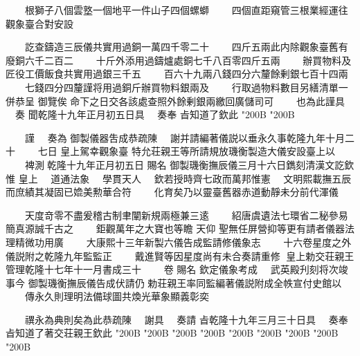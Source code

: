 \begin{正文}
　　根獅子八個雲墪一個地平一件山子四個螺螄
　　四個直距窺管三根業經運往觀象臺合對安設
\par
　　訖查鑄造三辰儀共實用過銅一萬四千零二十
　　四斤五兩此内除觀象臺舊有廢銅六千二百二
　　十斤外添用過鑄爐處銅七千八百零四斤五兩
　　辦買物料及匠役工價飯食共實用過銀三千五
　　百六十九兩八錢四分六釐餘剰銀七百十四兩
　　七錢四分四釐謹将用過銅斤辦買物料銀兩及
　　行取過物料數目另繕清單一併恭呈
御覽俟
命下之日交各該處查照外餘剰銀兩繳回廣儲司可
　　也為此謹具
　奏
聞乾隆十九年正月初五日具
　奏奉
㫖知道了欽此
\char"200B\relax{}
\char"200B\relax
\par
　　謹
　奏為
御製儀器吿成恭疏陳
　謝并請編著儀説以垂永久事乾隆九年十月二十
　　七日
皇上駕幸觀象臺
特允荘親王等所請規放璣衡製造大儀安設臺上以
　　裨測𠉀乾隆十九年正月初五日
賜名
御製璣衡撫辰儀三月十六日鐫刻清漢文訖欽惟
皇上
　道通法象
　學貫天人
　欽若授時齊七政而萬邦惟憲
　文明熙載撫五辰而庶績其凝固已嫓美勲華合符
　　化育矣乃以靈臺舊器赤道動靜未分前代渾儀
\par
　　天度竒零不盡爰稽古制聿闡新規兩極兼三逺
　　紹唐虞遺法七環省二秘參易簡真源誠千古之
　　鉅觀萬年之大寶也等瞻
天仰
聖無任屏營抑等更有請者儀器法理精微功用廣
　　大康熙十三年新製六儀告成監請修儀象志
　　十六卷星度之外儀説附之乾隆九年監監正
　　戴進賢等因星度尚有未合奏請重修𫎇
皇上勅交荘親王管理乾隆十七年十一月書成三十
　　卷
賜名
欽定儀象考成
　武英殿刋刻将次竣事今
御製璣衡撫辰儀告成伏請仍
勅荘親王率同監編著儀説附成全帙宣付史館以
　　傳永久則理明法備球圖共煥光華象顯義彰奕
\par
　　禩永為典則矣為此恭疏陳
　謝具
　奏請
㫖乾隆十九年三月三十日具
　奏奉
㫖知道了著交荘親王欽此
\char"200B\relax{}
\char"200B\relax{}
\char"200B\relax{}
\char"200B\relax{}
\char"200B\relax{}
\char"200B\relax{}
\char"200B\relax{}
\char"200B\relax{}
\char"200B\relax{}

\end{正文}
